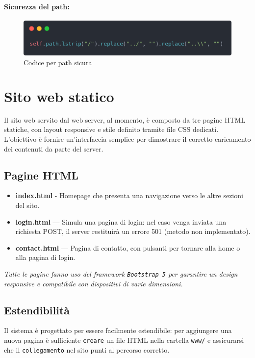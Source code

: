 \documentclass[a4paper,12pt]{report}
\begin{document}
\subsubsection{Sicurezza del path:}
\begin{figure}[H]
    \centering
    \includegraphics[width=1\textwidth]{img/safe_path.png}
    \caption{Codice per path sicura}
    \label{fig:safe_path}
\end{figure}


\chapter{Sito web statico}
Il sito web servito dal web server, al momento, è composto da tre pagine HTML statiche, con layout responsive e stile definito
tramite file CSS dedicati. L'obiettivo è fornire un'interfaccia semplice per dimostrare il corretto caricamento dei contenuti
da parte del server.

\section{Pagine HTML}

\begin{itemize}
    \item \textbf{index.html} - Homepage che presenta una navigazione verso le altre sezioni del sito.
    \item \textbf{login.html} — Simula una pagina di login: nel caso venga inviata una richiesta POST, il server restituirà un errore 501 (metodo non implementato).
    \item \textbf{contact.html} — Pagina di contatto, con pulsanti per tornare alla home o alla pagina di login.
\end{itemize}
%
\textit{Tutte le pagine fanno uso del framework \texttt{Bootstrap 5} per garantire un design responsive e compatibile con dispositivi di varie dimensioni.}

\section{Estendibilità}

Il sistema è progettato per essere facilmente estendibile: per aggiungere una nuova pagina è sufficiente \texttt{creare} un file HTML nella cartella
\texttt{www/} e assicurarsi che il \texttt{collegamento} nel sito punti al percorso corretto.
\end{document}
